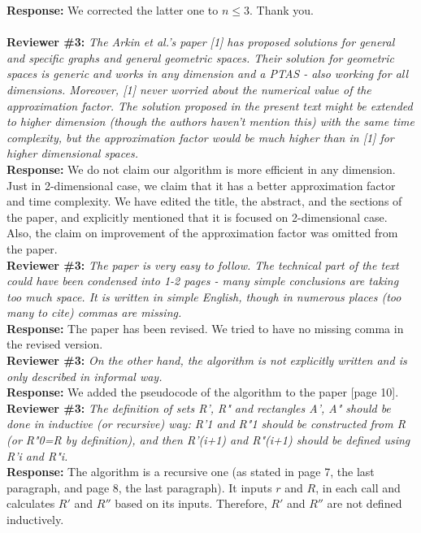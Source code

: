 \documentclass[review]{elsarticle}
\begin{document}
\textbf{Response:} We corrected the latter one to $n\le3$. Thank you.\\
\\
\textbf{Reviewer \#3:} \textit{The Arkin et al.'s paper [1] has proposed solutions for general and specific graphs and general geometric spaces. Their solution for geometric spaces is generic and works in any dimension and a PTAS - also working for all dimensions. Moreover, [1] never worried about the numerical value of the approximation factor. The solution proposed in the present text might be extended to higher dimension (though the authors haven't mention this) with the same time complexity, but the approximation factor would be much higher than in [1] for higher dimensional spaces.}\\
\textbf{Response:} We do not claim our algorithm is more efficient in any dimension. Just in 2-dimensional case, we claim that it has a better approximation factor and time complexity. We have edited the title, the abstract, and the sections of the paper, and explicitly mentioned that it is focused on 2-dimensional case. Also, the claim on improvement of the approximation factor was omitted from the paper.
\\
\textbf{Reviewer \#3:} \textit{The paper is very easy to follow. The technical part of the text could have been condensed into 1-2 pages - many simple conclusions are taking too much space. It is written in simple English, though in numerous places (too many to cite) commas are missing.} \\
\textbf{Response:} The paper has been revised. We tried to have no missing comma in the revised version.
\\
\textbf{Reviewer \#3:} \textit{On the other hand, the algorithm is not explicitly written and is only described in informal way.}\\
\textbf{Response:} We added the pseudocode of the algorithm to the paper [page 10].
\\
\textbf{Reviewer \#3:} \textit{The definition of sets R', R" and rectangles A', A" should be done in inductive (or recursive) way: R'1 and R"1 should be constructed from R (or R"0=R by definition), and then R'(i+1) and R"(i+1) should be defined using R'i and R"i.}\\
\textbf{Response:} The algorithm is a recursive one (as stated in page 7, the last paragraph, and page 8, the last paragraph). It inputs $r$ and $R$, in each call and calculates $R'$ and $R''$ based on its inputs. Therefore, $R'$ and $R''$  are not defined inductively.
\end{document}
